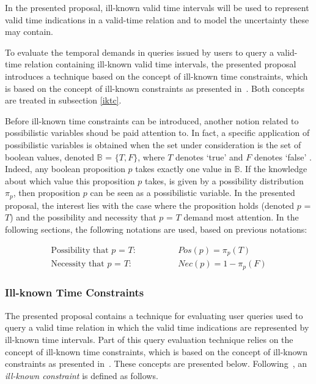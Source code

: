 
In the presented proposal, ill-known valid time intervals will be used to represent valid time indications in a valid-time relation and to model the uncertainty these may contain.

To evaluate the temporal demands in queries issued by users to query a valid-time relation containing ill-known valid time intervals, the presented proposal introduces a technique based on the concept of ill-known time constraints, which is based on the concept of ill-known constraints as presented in~\cite{Pon11}. Both concepts are treated in subsection \ref{iktc}.

Before ill-known time constraints can be introduced, another notion related to possibilistic variables shoud be paid attention to. In fact, a specific application of possibilistic variables is obtained when the set under consideration is the set of boolean values, denoted $\mathbb{B}$ = $\{T,F\}$, where $T$ denotes `true' and $F$ denotes `false' \cite{Pon11}. Indeed, any boolean proposition $p$ takes exactly one value in $\mathbb{B}$. If the knowledge about which value this proposition $p$ takes, is given by a possibility distribution $\pi_p$, then proposition $p$ can be seen as a possibilistic variable. In the presented proposal, the interest lies with the case where the proposition holds (denoted $p$ = $T$) and the possibility and necessity that $p$ = $T$ demand most attention. In the following sections, the following notations are used, based on previous notations:

\begin{align}
\text{Possibility that $p$ = $T$:} \hspace{50pt} & Pos(p) = \pi_p(T) \\
\text{Necessity that $p$ = $T$:} \hspace{50pt} & Nec(p) = 1-\pi_p(F) 
\end{align}


\subsubsection{\label{iktc}Ill-known Time Constraints}
The presented proposal contains a technique for evaluating user queries used to query a valid time relation in which the valid time indications are represented by ill-known time intervals. Part of this query evaluation technique relies on the concept of ill-known time constraints, which is based on the concept of ill-known constraints as presented in~\cite{Pon11}. These concepts are presented below. Following~\cite{Pon11}, an \emph{ill-known constraint} is defined as follows.

